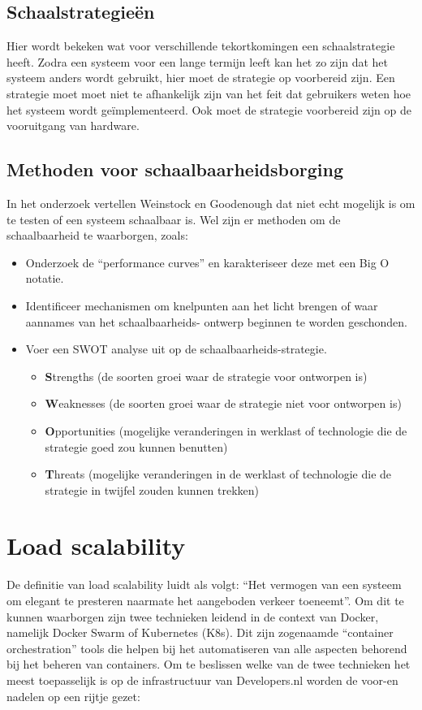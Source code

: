 \subsection{Schaalstrategieën}
Hier wordt bekeken wat voor verschillende tekortkomingen een schaalstrategie heeft. Zodra een systeem voor een lange termijn leeft kan het zo zijn dat het systeem anders wordt gebruikt, hier moet de strategie op voorbereid zijn. Een strategie moet moet niet te afhankelijk zijn van het feit dat gebruikers weten hoe het systeem wordt geïmplementeerd. Ook moet de strategie voorbereid zijn op de vooruitgang van hardware.

\subsection{Methoden voor schaalbaarheidsborging}
In het onderzoek vertellen Weinstock en Goodenough dat niet echt mogelijk is om te testen of een systeem schaalbaar is. Wel zijn er methoden om de schaalbaarheid te waarborgen, zoals:
\begin{itemize}
	\item Onderzoek de \enquote{performance curves} en karakteriseer deze met een Big O notatie.
	\item Identificeer mechanismen om knelpunten aan het licht brengen of waar aannames van het schaalbaarheids- ontwerp beginnen te worden geschonden.
	\item Voer een SWOT analyse uit op de schaalbaarheids-strategie.
	\begin{itemize}
		\item \textbf{S}trengths (de soorten groei waar de strategie voor ontworpen is)
		\item \textbf{W}eaknesses (de soorten groei waar de strategie niet voor ontworpen is)
		\item \textbf{O}pportunities (mogelijke veranderingen in werklast of technologie die de strategie goed zou kunnen benutten)
		\item \textbf{T}hreats (mogelijke veranderingen in de werklast of technologie die de strategie in twijfel zouden kunnen trekken)
	\end{itemize}
\end{itemize}

\section{Load scalability}

De definitie van load scalability luidt als volgt: \enquote{Het vermogen van een systeem om elegant te presteren naarmate het aangeboden verkeer toeneemt}. Om dit te kunnen waarborgen zijn twee technieken leidend in de context van Docker, namelijk Docker Swarm of Kubernetes (K8s). Dit zijn zogenaamde \enquote{container orchestration} tools die helpen bij het automatiseren van alle aspecten behorend bij het beheren van containers. Om te beslissen welke van de twee technieken het meest toepasselijk is op de infrastructuur van Developers.nl worden de voor-en nadelen op een rijtje gezet:


